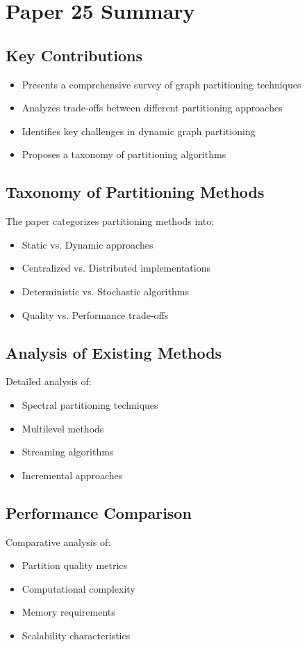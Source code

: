 \section{Paper 25 Summary}

\subsection{Key Contributions}
\begin{itemize}
    \item Presents a comprehensive survey of graph partitioning techniques
    \item Analyzes trade-offs between different partitioning approaches
    \item Identifies key challenges in dynamic graph partitioning
    \item Proposes a taxonomy of partitioning algorithms
\end{itemize}

\subsection{Taxonomy of Partitioning Methods}
The paper categorizes partitioning methods into:
\begin{itemize}
    \item Static vs. Dynamic approaches
    \item Centralized vs. Distributed implementations
    \item Deterministic vs. Stochastic algorithms
    \item Quality vs. Performance trade-offs
\end{itemize}

\subsection{Analysis of Existing Methods}
Detailed analysis of:
\begin{itemize}
    \item Spectral partitioning techniques
    \item Multilevel methods
    \item Streaming algorithms
    \item Incremental approaches
\end{itemize}

\subsection{Performance Comparison}
Comparative analysis of:
\begin{itemize}
    \item Partition quality metrics
    \item Computational complexity
    \item Memory requirements
    \item Scalability characteristics
\end{itemize}

